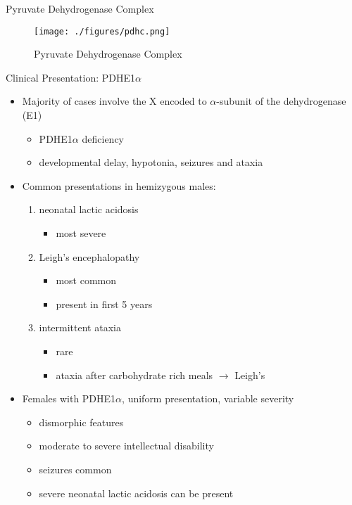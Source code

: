 \documentclass[presentation, smaller]{beamer}
\begin{document}
\begin{frame}[label={sec:orga89f503}]{Pyruvate Dehydrogenase Complex}
\begin{figure}[htbp]
\centering
\texttt{[image: ./figures/pdhc.png]}
\caption[pdhc]{\label{fig:org67c947d}
Pyruvate Dehydrogenase Complex}
\end{figure}
\end{frame}


\begin{frame}[label={sec:org913e587}]{Clinical Presentation: PDHE1\(\alpha\)}
\begin{itemize}
\item Majority of cases involve the X encoded to \(\alpha\)-subunit of the dehydrogenase (E1)
\begin{itemize}
\item PDHE1\(\alpha\) deficiency
\item developmental delay, hypotonia, seizures and ataxia
\end{itemize}

\item Common presentations in hemizygous males:
\begin{enumerate}
\item neonatal lactic acidosis
\begin{itemize}
\item most severe
\end{itemize}
\item Leigh's encephalopathy
\begin{itemize}
\item most common
\item present in first 5 years
\end{itemize}
\item intermittent ataxia
\begin{itemize}
\item rare
\item ataxia after carbohydrate rich meals \(\to\) Leigh's
\end{itemize}
\end{enumerate}

\item Females with PDHE1\(\alpha\), uniform presentation, variable severity
\begin{itemize}
\item dismorphic features
\item moderate to severe intellectual disability
\item seizures common
\item severe neonatal lactic acidosis can be present
\end{itemize}
\end{itemize}
\end{frame}
\end{document}
